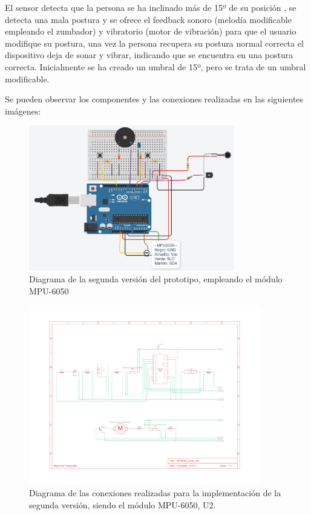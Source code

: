 El sensor detecta que la persona se ha inclinado más de 15º de su posición , se detecta una mala postura y se ofrece el feedback sonoro (melodía modificable empleando el zumbador) y vibratorio (motor de vibración) para que el usuario modifique su postura, una vez la persona recupera su postura normal correcta el dispositivo deja de sonar y vibrar, indicando que se encuentra en una postura correcta. Inicialmente se ha creado un umbral de 15º, pero se trata de un umbral modificable.

Se pueden observar los componentes y las conexiones realizadas en las siguientes imágenes:

\begin{figure}[h!]
    \centering
    \includegraphics[width=0.8\textwidth]{img/PrototipoV2_MPU6050.png}
    \caption{Diagrama de la segunda versión del prototipo, empleando el módulo MPU-6050}
    \label{fig:ProtV1} %
\end{figure}

\begin{figure}[h]
    \centering
    \includegraphics[width=0.9\textwidth]{img/Prot_V2_Esquema.pdf}
    \caption{Diagrama de las conexiones realizadas para la implementación de la segunda versión, siendo el módulo MPU-6050, U2.}
    \label{fig:ProtV1_esquema} %
\end{figure}



